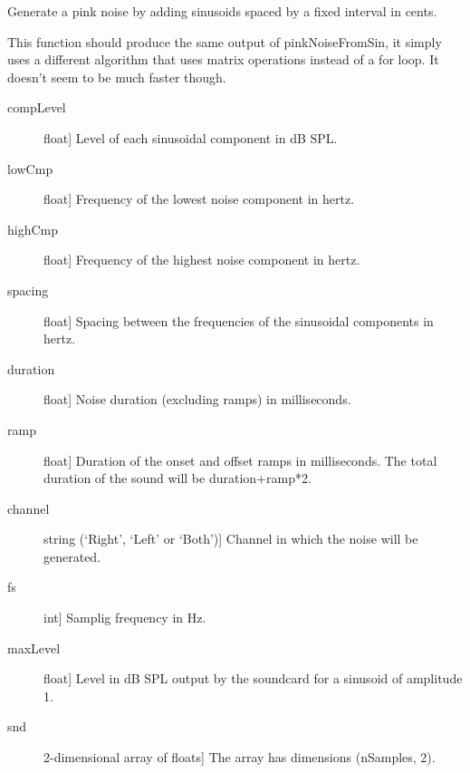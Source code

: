 \documentclass[letterpaper,10pt,english]{sphinxmanual}
\begin{document}

\begin{fulllineitems}
\label{index:sndlib.pinkNoiseFromSin2}
Generate a pink noise by adding sinusoids spaced by a fixed
interval in cents.

This function should produce the same output of pinkNoiseFromSin,
it simply uses a different algorithm that uses matrix operations
instead of a for loop. It doesn't seem to be much faster though.
\begin{description}
\item[{compLevel}] \leavevmode{[}float{]}
Level of each sinusoidal component in dB SPL.

\item[{lowCmp}] \leavevmode{[}float{]}
Frequency of the lowest noise component in hertz.

\item[{highCmp}] \leavevmode{[}float{]}
Frequency of the highest noise component in hertz.

\item[{spacing}] \leavevmode{[}float{]}
Spacing between the frequencies of the sinusoidal components
in hertz.

\item[{duration}] \leavevmode{[}float{]}
Noise duration (excluding ramps) in milliseconds.

\item[{ramp}] \leavevmode{[}float{]}
Duration of the onset and offset ramps in milliseconds.
The total duration of the sound will be duration+ramp*2.

\item[{channel}] \leavevmode{[}string (`Right', `Left' or `Both'){]}
Channel in which the noise will be generated.

\item[{fs}] \leavevmode{[}int{]}
Samplig frequency in Hz.

\item[{maxLevel}] \leavevmode{[}float{]}
Level in dB SPL output by the soundcard for a sinusoid of amplitude 1.

\end{description}
\begin{description}
\item[{snd}] \leavevmode{[}2-dimensional array of floats{]}
The array has dimensions (nSamples, 2).


\end{description}
\end{fulllineitems}
\end{document}

